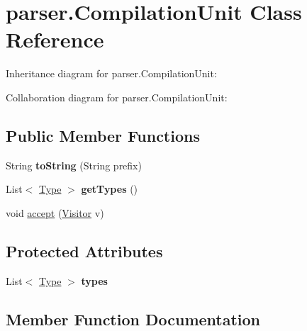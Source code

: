 \hypertarget{classparser_1_1_compilation_unit}{}\section{parser.\+Compilation\+Unit Class Reference}
\label{classparser_1_1_compilation_unit}


Inheritance diagram for parser.\+Compilation\+Unit\+:


Collaboration diagram for parser.\+Compilation\+Unit\+:
\subsection*{Public Member Functions}
\begin{DoxyCompactItemize}
\item 
String {\bfseries to\+String} (String prefix)\hypertarget{classparser_1_1_compilation_unit_ae3786754e511df9713ba5645d5021fef}{}\label{classparser_1_1_compilation_unit_ae3786754e511df9713ba5645d5021fef}

\item 
List$<$ \hyperlink{classparser_1_1_type}{Type} $>$ {\bfseries get\+Types} ()\hypertarget{classparser_1_1_compilation_unit_ac1b4c795db3e8afd291e3b2f043dddf7}{}\label{classparser_1_1_compilation_unit_ac1b4c795db3e8afd291e3b2f043dddf7}

\item 
void \hyperlink{classparser_1_1_compilation_unit_ac59e581916f1e4ce386bb33332583ed3}{accept} (\hyperlink{interfacemain_1_1_visitor}{Visitor} v)
\end{DoxyCompactItemize}
\subsection*{Protected Attributes}
\begin{DoxyCompactItemize}
\item 
List$<$ \hyperlink{classparser_1_1_type}{Type} $>$ {\bfseries types}\hypertarget{classparser_1_1_compilation_unit_a22769404522bdf9c2880fa6550cc394e}{}\label{classparser_1_1_compilation_unit_a22769404522bdf9c2880fa6550cc394e}

\end{DoxyCompactItemize}


\subsection{Member Function Documentation}
